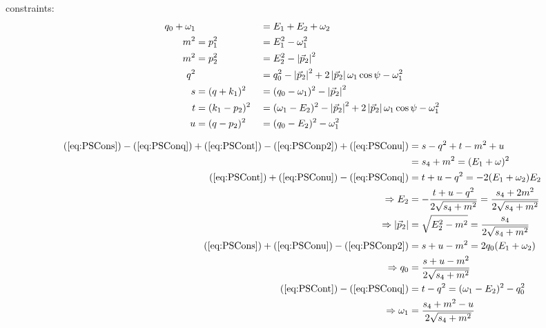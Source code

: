 \documentclass[
  ngerman,		%
  a4paper,		%
  11pt,			%
  DIV=12,		%
  parskip=half  	%
]{scrartcl}
\begin{document}
constraints:
\begin{align}
q_0+\omega_1 & &&=E_1+E_2+\omega_2 \label{eq:PSConMomCon}\\
m^2 &= p_1^2 &&= E_1^2 - \omega_1^2 \label{eq:PSConp1}\\
m^2 &= p_2^2 &&= E_2^2 - \left|\vec p_2\right|^2 \label{eq:PSConp2} \\
q^2 & &&= q_0^2 - \left|\vec p_2\right|^2 + 2\left|\vec p_2\right|\omega_1\cos\psi-\omega_1^2 \label{eq:PSConq}\\
s &= (q+k_1)^2 &&= (q_0-\omega_1)^2 - \left|\vec p_2\right|^2 \label{eq:PSCons}\\
t &= (k_1-p_2)^2 &&= (\omega_1-E_2)^2-\left|\vec p_2\right|^2+2\left|\vec p_2\right|\omega_1\cos\psi-\omega_1^2 \label{eq:PSCont}\\
u &= (q-p_2)^2 &&= (q_0-E_2)^2 - \omega_1^2 \label{eq:PSConu}
\end{align}

\begin{align}
(\ref{eq:PSCons}) - (\ref{eq:PSConq}) + (\ref{eq:PSCont}) - (\ref{eq:PSConp2}) + (\ref{eq:PSConu}) &= s-q^2+t-m^2+u\\
 &= s_4+m^2 = (E_1+\omega)^2 \label{eq:PSCons4}\\
(\ref{eq:PSCont}) + (\ref{eq:PSConu}) - (\ref{eq:PSConq}) &= t+u-q^2 = -2(E_1+\omega_2)E_2\\
\Rightarrow E_2 &= -\frac{t+u-q^2}{2\sqrt{s_4+m^2}} =\frac{s_4+2m^2}{2\sqrt{s_4+m^2}} \label{eq:PSConE2}\\
\Rightarrow \left|\vec p_2\right| &= \sqrt{E_2^2 - m^2} = \frac {s_4} {2\sqrt{s_4+m^2}}\label{eq:PSConabsp2}\\
(\ref{eq:PSCons})+(\ref{eq:PSConu})-(\ref{eq:PSConp2}) &= s+u-m^2 =2q_0(E_1+\omega_2)\\
\Rightarrow q_0 &= \frac{s+u-m^2}{2\sqrt{s_4+m^2}} \label{eq:PSConq0}\\
(\ref{eq:PSCont}) - (\ref{eq:PSConq}) &= t-q^2 = (\omega_1-E_2)^2 - q_0^2\\
\Rightarrow \omega_1 &= \frac{s_4+m^2-u}{2\sqrt{s_4+m^2}} \label{eq:PSConom1}
\end{align}
\end{document}
